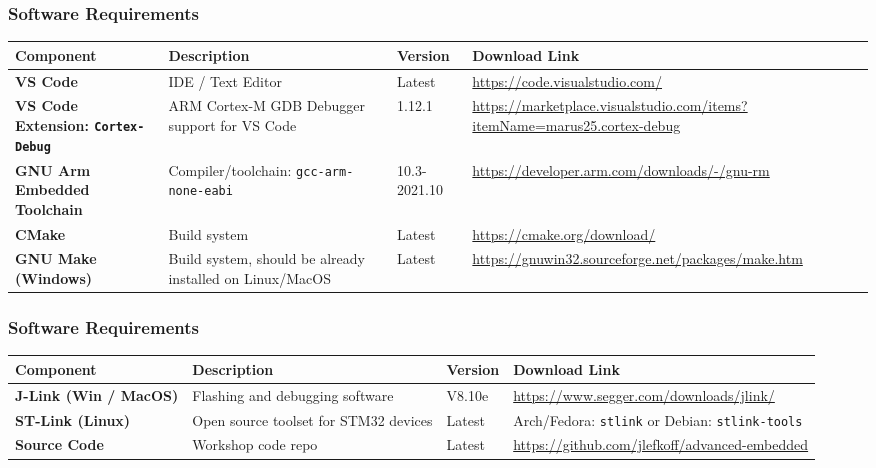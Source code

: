 \documentclass{beamer}
\begin{document}
\begin{frame}
    \frametitle{Software Requirements}
    \footnotesize
    \vspace{-0.5cm}
    \begin{table}[]
        \begin{tabular}{|p{2cm}|p{3cm}|p{1cm}|p{3.5cm}|}
            \hline
            \textbf{Component} & \textbf{Description} & \textbf{Version} & \textbf{Download Link} \\ \hline
            \textbf{VS Code} & IDE / Text Editor & Latest & \url{https://code.visualstudio.com/} \\ \hline
            \textbf{VS Code Extension: \texttt{Cortex-Debug}} & ARM Cortex-M GDB Debugger support for VS Code & 1.12.1 & \url{https://marketplace.visualstudio.com/items?itemName=marus25.cortex-debug} \\ \hline
            \textbf{GNU Arm Embedded Toolchain} & Compiler/toolchain: \texttt{gcc-arm-none-eabi} & 10.3-2021.10 & \url{https://developer.arm.com/downloads/-/gnu-rm} \\ \hline
            \textbf{CMake} & Build system & Latest & \url{https://cmake.org/download/} \\ \hline
			\textbf{GNU Make (Windows)} & Build system, should be already installed on Linux/MacOS & Latest & \url{https://gnuwin32.sourceforge.net/packages/make.htm} \\ \hline
        \end{tabular}
    \end{table}
\end{frame}

\begin{frame}
    \frametitle{Software Requirements}
    \footnotesize
    \vspace{-0.5cm}
    \begin{table}[]
        \begin{tabular}{|p{2cm}|p{3cm}|p{1cm}|p{3.5cm}|}
            \hline
            \textbf{Component} & \textbf{Description} & \textbf{Version} & \textbf{Download Link} \\ \hline
            \textbf{J-Link (Win / MacOS)} & Flashing and debugging software & V8.10e & \url{https://www.segger.com/downloads/jlink/} \\ \hline
            \textbf{ST-Link (Linux)} & Open source toolset for STM32 devices & Latest & Arch/Fedora: \texttt{stlink} or Debian: \texttt{stlink-tools} \\ \hline
            \textbf{Source Code} & Workshop code repo & Latest & \url{https://github.com/jlefkoff/advanced-embedded} \\ \hline
        \end{tabular}
    \end{table}
\end{frame}
\end{document}
